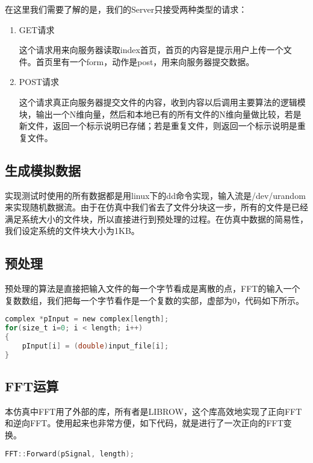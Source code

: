 在这里我们需要了解的是，我们的Server只接受两种类型的请求：

\begin{enumerate}
\item GET请求

这个请求用来向服务器读取index首页，首页的内容是提示用户上传一个文件。首页里有一个form，动作是post，用来向服务器提交数据。

\item POST请求

这个请求真正向服务器提交文件的内容，收到内容以后调用主要算法的逻辑模块，输出一个N维向量，然后和本地已有的所有文件的N维向量做比较，若是新文件，返回一个标示说明已存储；若是重复文件，则返回一个标示说明是重复文件。
\end{enumerate}

\subsection{生成模拟数据}

实现测试时使用的所有数据都是用linux下的dd命令实现，输入流是/dev/urandom来实现随机数据流。由于在仿真中我们省去了文件分块这一步，所有的文件是已经满足系统大小的文件块，所以直接进行到预处理的过程。在仿真中数据的简易性，我们设定系统的文件块大小为1KB。

\subsection{预处理}

预处理的算法是直接把输入文件的每一个字节看成是离散的点，FFT的输入一个复数数组，我们把每一个字节看作是一个复数的实部，虚部为0，代码如下所示。

\begin{lstlisting}[language={C}, caption={预处理}]
complex *pInput = new complex[length];
for(size_t i=0; i < length; i++) 
{
	pInput[i] = (double)input_file[i];
}
\end{lstlisting}

\subsection{FFT运算}

本仿真中FFT用了外部的库，所有者是LIBROW，这个库高效地实现了正向FFT和逆向FFT。使用起来也非常方便，如下代码，就是进行了一次正向的FFT变换。
\begin{lstlisting}[language={C}, caption={预处理}]
FFT::Forward(pSignal, length);
\end{lstlisting}

